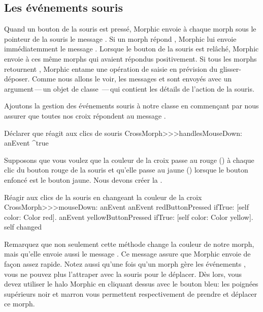 \documentclass[a4paper,10pt,twoside]{book}
\begin{document}
\subsection{Les événements souris}

Quand un bouton de la souris est pressé, Morphic envoie à chaque
morph sous le pointeur de la souris le message
. Si un morph répond , Morphic lui
envoie immédiatemment le message . Lorsque
le bouton de la souris est relâché, Morphic envoie
  à ces même morphs qui avaient répondus
positivement. Si tous les morphs retournent , Morphic entame
une opération de
saisie en prévision du glisser-déposer.
Comme nous allons le voir, les messages  et 
sont envoyés avec un argument\,---\,un objet de classe
\,---\,qui contient les détails de l'action de la souris.

Ajoutons la gestion des événements souris à notre classe
 en commençant par nous assurer que toutes nos
croix répondent  au message .

\begin{method}{Déclarer que  réagit aux clics de souris}
CrossMorph>>>handlesMouseDown: anEvent
	^true
\end{method}

Supposons que vous voulez que la couleur de la croix passe au rouge
()
à chaque clic du bouton rouge de la souris et qu'elle passe au jaune
()
lorsque le bouton enfoncé est le bouton jaune. 
Nous devons créer la .

\begin{method}[mouseDown]{Réagir aux clics de la souris en changeant la couleur de la croix}
CrossMorph>>>mouseDown: anEvent
	anEvent redButtonPressed
		ifTrue: [self color: Color red].
	anEvent yellowButtonPressed
		ifTrue: [self color: Color yellow].
	self changed
\end{method}

Remarquez que non seulement cette méthode change la couleur de notre
morph, mais qu'elle envoie aussi le message .
Ce message assure que Morphic envoie 
de façon assez rapide.
Notez aussi qu'une fois qu'un morph gère les événements , vous ne pouvez plus l'attraper avec la souris pour le déplacer.
Dès lors, vous devez utiliser le halo Morphic en cliquant dessus avec le
bouton bleu: les poignées supérieurs noir \grabHandle{}
et marron \moveHandle{} 
vous permettent respectivement de prendre et déplacer ce morph.
\end{document}
